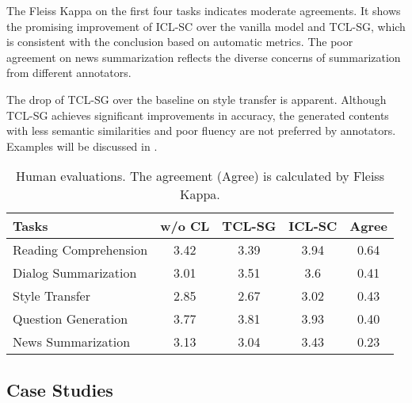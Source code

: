 The Fleiss Kappa on the first four tasks indicates moderate agreements. It shows the promising improvement of ICL-SC over the vanilla model and TCL-SG, which is consistent with the conclusion based on automatic metrics. The poor agreement on news summarization reflects the 
diverse concerns of summarization from different 
annotators. 

The drop of TCL-SG over the baseline on style transfer is apparent. Although TCL-SG achieves significant improvements in accuracy, the generated contents with less semantic similarities and poor fluency are not preferred by annotators. Examples will be discussed in .

\begin{table}
	\scriptsize
	\centering
	\begin{tabular}{l|ccc|c}
		\hline
		{Tasks} & {w/o CL} & {TCL-SG} & {ICL-SC} & {Agree}  \\
		\hline
		Reading Comprehension  &3.42 & 3.39 &3.94 &0.64 \\
		Dialog Summarization &3.01 &3.51 &3.6 &0.41 \\
		Style Transfer &2.85 &2.67 & 3.02&0.43 \\
		Question Generation &3.77 & 3.81 &3.93 &0.40 \\
		News Summarization & 3.13 &3.04 &3.43 &0.23 \\
		\hline
	\end{tabular}
	\caption{Human evaluations. The agreement (Agree) is calculated by Fleiss Kappa.}
	\label{tab:humaneval}
\end{table}


 
\subsection{Case Studies}
\label{sec:casestudies}

